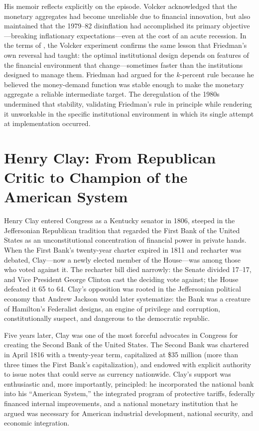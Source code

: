 \documentclass[12pt]{article}
\begin{document}
His memoir \citep{VolckerHarper2018} reflects explicitly on the episode.
Volcker acknowledged that the monetary aggregates had become unreliable
due to financial innovation, but also maintained that the 1979--82
disinflation had accomplished its primary objective---breaking
inflationary expectations---even at the cost of an acute recession.
In the terms of \citet{Sargent2011}, the Volcker experiment confirms
the same lesson that Friedman's own reversal had taught: the optimal
institutional design depends on features of the financial environment
that change---sometimes faster than the institutions designed to manage
them.  Friedman had argued for the $k$-percent rule because he believed
the money-demand function was stable enough to make the monetary
aggregate a reliable intermediate target.  The deregulation of the 1980s
undermined that stability, validating Friedman's rule in principle while
rendering it unworkable in the specific institutional environment in
which its single attempt at implementation occurred.


\section{Henry Clay: From Republican Critic to Champion of the American
         System}

Henry Clay entered Congress as a Kentucky senator in 1806, steeped in
the Jeffersonian Republican tradition that regarded the First Bank of
the United States as an unconstitutional concentration of financial power
in private hands.  When the First Bank's twenty-year charter expired in
1811 and recharter was debated, Clay---now a newly elected member of the
House---was among those who voted against it.  The recharter bill died
narrowly: the Senate divided 17--17, and Vice President George Clinton
cast the deciding vote against; the House defeated it 65 to 64.  Clay's
opposition was rooted in the Jeffersonian political economy that Andrew
Jackson would later systematize: the Bank was a creature of Hamilton's
Federalist designs, an engine of privilege and corruption, constitutionally
suspect, and dangerous to the democratic republic.

Five years later, Clay was one of the most forceful advocates in Congress
for creating the Second Bank of the United States.  The Second Bank was
chartered in April 1816 with a twenty-year term, capitalized at \$35
million (more than three times the First Bank's capitalization), and
endowed with explicit authority to issue notes that could serve as
currency nationwide.  Clay's support was enthusiastic and, more
importantly, principled: he incorporated the national bank into his
``American System,'' the integrated program of protective tariffs,
federally financed internal improvements, and a national monetary
institution that he argued was necessary for American industrial
development, national security, and economic integration.
\end{document}
